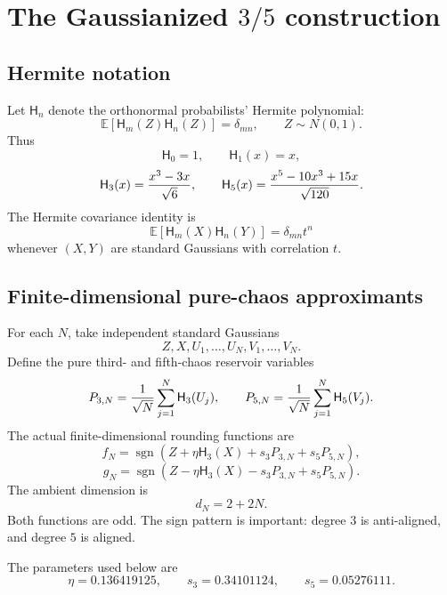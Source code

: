 \documentclass[11pt]{article}
\newcommand{\E}{\mathbb{E}}
\newcommand{\1}{\mathbf{1}}
\newcommand{\sgn}{\operatorname{sgn}}
\newcommand{\Herm}{\mathsf H}
\begin{document}
\section{The Gaussianized \texorpdfstring{\(3/5\)}{3/5} construction}

\subsection{Hermite notation}

Let \(\Herm_n\) denote the orthonormal probabilists' Hermite polynomial:
\[
        \E[\Herm_m(Z)\Herm_n(Z)]=\delta_{mn},
        \qquad Z\sim N(0,1).
\]
Thus
\[
        \Herm_0=1,
        \qquad
        \Herm_1(x)=x,
\]
\[
        \Herm_3(x)={x^3-3x\over\sqrt6},
        \qquad
        \Herm_5(x)={x^5-10x^3+15x\over\sqrt{120}}.
\]
The Hermite covariance identity is
\begin{equation}\label{eq:hermite-cov}
        \E[\Herm_m(X)\Herm_n(Y)]=\delta_{mn}t^n
\end{equation}
whenever \((X,Y)\) are standard Gaussians with correlation \(t\).

\subsection{Finite-dimensional pure-chaos approximants}

For each \(N\), take independent standard Gaussians
\[
        Z,X,U_1,\ldots,U_N,V_1,\ldots,V_N.
\]
Define the pure third- and fifth-chaos reservoir variables
\[
        P_{3,N}={1\over\sqrt N}\sum_{j=1}^N\Herm_3(U_j),
        \qquad
        P_{5,N}={1\over\sqrt N}\sum_{j=1}^N\Herm_5(V_j).
\]
The actual finite-dimensional rounding functions are
\begin{equation}\label{eq:finite-fN}
        f_N=\sgn\left(Z+\eta\Herm_3(X)+s_3P_{3,N}+s_5P_{5,N}\right),
\end{equation}
\begin{equation}\label{eq:finite-gN}
        g_N=\sgn\left(Z-\eta\Herm_3(X)-s_3P_{3,N}+s_5P_{5,N}\right).
\end{equation}
The ambient dimension is
\[
        d_N=2+2N.
\]
Both functions are odd.  The sign pattern is important: degree \(3\) is anti-aligned, and degree \(5\) is aligned.

The parameters used below are
\begin{equation}\label{eq:params}
        \eta=0.136419125,
        \qquad
        s_3=0.34101124,
        \qquad
        s_5=0.05276111.
\end{equation}
\end{document}
